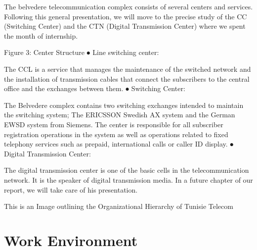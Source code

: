 The belvedere telecommunication complex consists of several centers and services. Following this general presentation, we will move to the precise study of the CC (Switching Center) and the CTN (Digital Transmission Center) where we spent the month of internship.

Figure 3: Center Structure
⦁ Line switching center:

The CCL is a service that manages the maintenance of the switched network and the installation of transmission cables that connect the subscribers to the central office and the exchanges between them.
⦁ Switching Center:

The Belvedere complex contains two switching exchanges intended to maintain the switching system; The ERICSSON Swedish AX system and the German EWSD system from Siemens. The center is responsible for all subscriber registration operations in the system as well as operations related to fixed telephony services such as prepaid, international calls or caller ID display.
⦁ Digital Transmission Center:

The digital transmission center is one of the basic cells in the telecommunication network. It is the speaker of digital transmission media. In a future chapter of our report, we will take care of his presentation.



	This is an Image outlining the Organizational Hierarchy of Tunisie Telecom



\section{Work Environment}
\blindtext